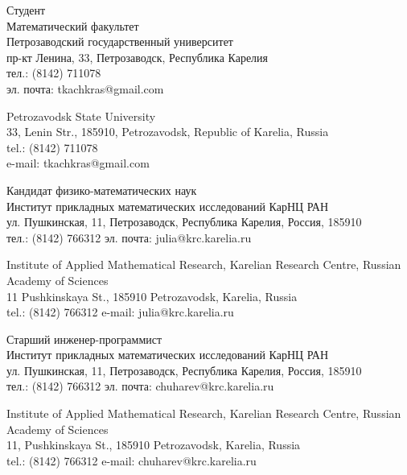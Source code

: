 \documentclass{article}
\begin{document}
\begin{aboutauthors}
Студент\\
Математический факультет\\ 
Петрозаводский государственный университет\\
пр-кт Ленина, 33, Петрозаводск, Республика Карелия\\
тел.: (8142) 711078\\
эл. почта: tkachkras@gmail.com

\columnbreak

Petrozavodsk State University\\
33, Lenin Str., 185910, Petrozavodsk, Republic of Karelia, Russia\\
tel.: (8142) 711078\\
e-mail: tkachkras@gmail.com 
\end{aboutauthors}

\begin{aboutauthors}
Кандидат физико-математических наук\\ 
Институт прикладных математических исследований КарНЦ РАН\\ 
ул. Пушкинская, 11, Петрозаводск, Республика Карелия, Россия, 185910\\
тел.: (8142) 766312
эл. почта: julia@krc.karelia.ru

\columnbreak

Institute of Applied Mathematical Research, Karelian Research Centre, Russian Academy of Sciences\\
11 Pushkinskaya St., 185910 Petrozavodsk, Karelia, Russia\\
tel.: (8142) 766312
e-mail: julia@krc.karelia.ru
\end{aboutauthors}

\begin{aboutauthors}
Старший инженер-программист\\ 
Институт прикладных математических исследований КарНЦ РАН\\ 
ул. Пушкинская, 11, Петрозаводск, Республика Карелия, Россия, 185910\\
тел.: (8142) 766312
эл. почта: chuharev@krc.karelia.ru

\columnbreak

Institute of Applied Mathematical Research, Karelian Research Centre, Russian Academy of Sciences\\
11, Pushkinskaya St., 185910 Petrozavodsk, Karelia, Russia\\
tel.: (8142) 766312
e-mail: chuharev@krc.karelia.ru
\end{aboutauthors}
\end{document}
